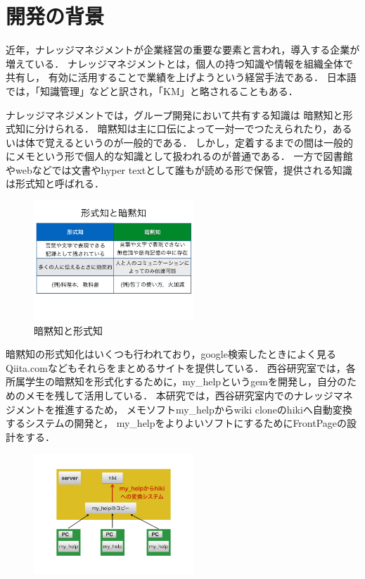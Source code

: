 \section{開発の背景}
近年，ナレッジマネジメントが企業経営の重要な要素と言われ，導入する企業が増えている．
ナレッジマネジメントとは，個人の持つ知識や情報を組織全体で共有し，
有効に活用することで業績を上げようという経営手法である．
日本語では，「知識管理」などと訳され，「KM」と略されることもある\cite{a}．

ナレッジマネジメントでは，グループ開発において共有する知識は
暗黙知と形式知に分けられる\cite{b}．
暗黙知は主に口伝によって一対一でつたえられたり，あるいは体で覚えるというのが一般的である．
しかし，定着するまでの間は一般的にメモという形で個人的な知識として扱われるのが普通である．
一方で図書館やwebなどでは文書やhyper textとして誰もが読める形で保管，提供される知識は形式知と呼ばれる．

\begin{figure}[htbp]
\begin{center}
\includegraphics[width=6cm,bb=100 100 600 700]{my_help2hiki_saki.001.png}
\caption{暗黙知と形式知}
\label{default}\end{center}\end{figure}


暗黙知の形式知化はいくつも行われており，google検索したときによく見るQiita.comなどもそれらをまとめるサイトを提供している．
西谷研究室では，各所属学生の暗黙知を形式化するために，my\_helpというgemを開発し，自分のためのメモを残して活用している．
本研究では，西谷研究室内でのナレッジマネジメントを推進するため，
メモソフトmy\_helpからwiki cloneのhikiへ自動変換するシステムの開発と，
my\_helpをよりよいソフトにするためにFrontPageの設計をする．

\begin{figure}[htbp]
\begin{center}
\includegraphics[width=6cm,bb=100 100 600 700]{my_help2hiki_saki.011.png}
\caption{}
\label{default}\end{center}\end{figure}
